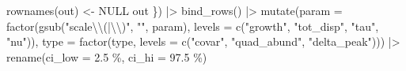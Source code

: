 \documentclass[
  letterpaper,
  DIV=11,
  numbers=noendperiod]{scrartcl}
\newenvironment{Shaded}{\begin{snugshade}}{\end{snugshade}}
\newcommand{\AttributeTok}[1]{\textcolor[rgb]{0.40,0.45,0.13}{#1}}
\newcommand{\ConstantTok}[1]{\textcolor[rgb]{0.56,0.35,0.01}{#1}}
\newcommand{\FunctionTok}[1]{\textcolor[rgb]{0.28,0.35,0.67}{#1}}
\newcommand{\NormalTok}[1]{\textcolor[rgb]{0.00,0.23,0.31}{#1}}
\newcommand{\OtherTok}[1]{\textcolor[rgb]{0.00,0.23,0.31}{#1}}
\newcommand{\SpecialCharTok}[1]{\textcolor[rgb]{0.37,0.37,0.37}{#1}}
\newcommand{\StringTok}[1]{\textcolor[rgb]{0.13,0.47,0.30}{#1}}
\begin{document}
\begin{Shaded}
\begin{Highlighting}[]
        \FunctionTok{rownames}\NormalTok{(out) }\OtherTok{\textless{}{-}} \ConstantTok{NULL}
\NormalTok{        out}
\NormalTok{    \}) }\SpecialCharTok{|\textgreater{}} 
    \FunctionTok{bind\_rows}\NormalTok{() }\SpecialCharTok{|\textgreater{}} 
    \FunctionTok{mutate}\NormalTok{(}\AttributeTok{param =} \FunctionTok{factor}\NormalTok{(}\FunctionTok{gsub}\NormalTok{(}\StringTok{"scale}\SpecialCharTok{\textbackslash{}\textbackslash{}}\StringTok{(|}\SpecialCharTok{\textbackslash{}\textbackslash{}}\StringTok{)"}\NormalTok{, }\StringTok{""}\NormalTok{, param), }
                          \AttributeTok{levels =} \FunctionTok{c}\NormalTok{(}\StringTok{"growth"}\NormalTok{, }\StringTok{"tot\_disp"}\NormalTok{, }\StringTok{"tau"}\NormalTok{, }\StringTok{"nu"}\NormalTok{)),}
           \AttributeTok{type =} \FunctionTok{factor}\NormalTok{(type, }
                         \AttributeTok{levels =} \FunctionTok{c}\NormalTok{(}\StringTok{"covar"}\NormalTok{, }\StringTok{"quad\_abund"}\NormalTok{, }\StringTok{"delta\_peak"}\NormalTok{))) }\SpecialCharTok{|\textgreater{}} 
    \FunctionTok{rename}\NormalTok{(}\AttributeTok{ci\_low =} \StringTok{\textasciigrave{}}\AttributeTok{2.5 \%}\StringTok{\textasciigrave{}}\NormalTok{, }
           \AttributeTok{ci\_hi =} \StringTok{\textasciigrave{}}\AttributeTok{97.5 \%}\StringTok{\textasciigrave{}}\NormalTok{)}






\end{Highlighting}
\end{Shaded}
\end{document}
